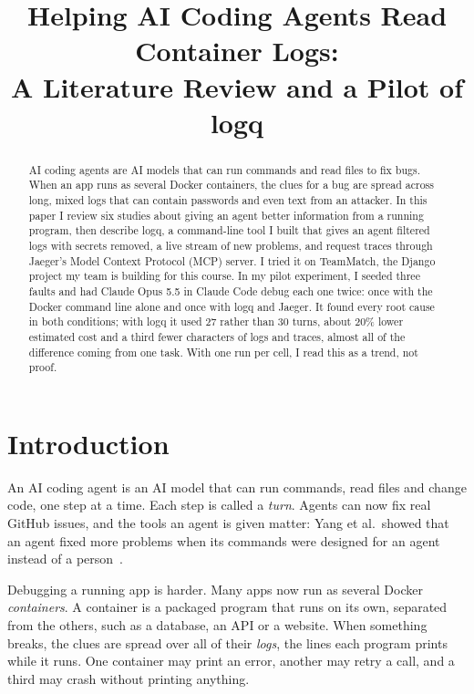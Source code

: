 \documentclass[10pt,conference]{IEEEtran}
\begin{document}
\title{Helping AI Coding Agents Read Container Logs:\\A Literature Review and a Pilot of logq}
\author{}
\maketitle

\begin{abstract}
AI coding agents are AI models that can run commands and read files to fix bugs. When an app runs as several Docker containers, the clues for a bug are spread across long, mixed logs that can contain passwords and even text from an attacker. In this paper I review six studies about giving an agent better information from a running program, then describe logq, a command-line tool I built that gives an agent filtered logs with secrets removed, a live stream of new problems, and request traces through Jaeger's Model Context Protocol (MCP) server. I tried it on TeamMatch, the Django project my team is building for this course. In my pilot experiment, I seeded three faults and had Claude Opus 5.5 in Claude Code debug each one twice: once with the Docker command line alone and once with logq and Jaeger. It found every root cause in both conditions; with logq it used 27 rather than 30 turns, about 20\% lower estimated cost and a third fewer characters of logs and traces, almost all of the difference coming from one task. With one run per cell, I read this as a trend, not proof.
\end{abstract}

\section{Introduction}

An AI coding agent is an AI model that can run commands, read files and change code, one step at a time. Each step is called a \emph{turn}. Agents can now fix real GitHub issues, and the tools an agent is given matter: Yang et al.\ showed that an agent fixed more problems when its commands were designed for an agent instead of a person~\cite{yang2024sweagent}.

Debugging a running app is harder. Many apps now run as several Docker \emph{containers}. A container is a packaged program that runs on its own, separated from the others, such as a database, an API or a website. When something breaks, the clues are spread over all of their \emph{logs}, the lines each program prints while it runs. One container may print an error, another may retry a call, and a third may crash without printing anything.
\end{document}
